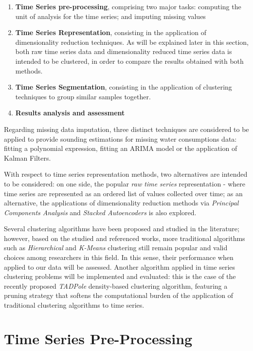 \documentclass[9pt,journal,compsoc]{IEEEtran}
\begin{document}
\begin{enumerate}
	\item \textbf{Time Series pre-processing}, comprising two major tasks: computing the unit of analysis for the time series; and imputing missing values
	
	\item \textbf{Time Series Representation}, consisting in the application of dimensionality reduction techniques. As will be explained later in this section, both raw time series data and dimensionality reduced time series data is intended to be clustered, in order to compare the results obtained with both methods.
	
	\item \textbf{Time Series Segmentation}, consisting in the application of clustering techniques to group similar samples together.
	
	\item \textbf{Results analysis and assessment}
\end{enumerate}
 
Regarding missing data imputation, three distinct techniques are considered to be applied to provide sounding estimations for missing water consumptions data: fitting a polynomial expression, fitting an ARIMA model or the application of Kalman Filters.

With respect to time series representation methods, two alternatives are intended to be considered: on one side, the popular \emph{raw time series} representation - where time series are represented as an ordered list of values collected over time; as an alternative, the applications of dimensionality reduction methods via \emph{Principal Components Analysis} and \emph{Stacked Autoencoders} is also explored.
	
Several clustering algorithms have been proposed and studied in the literature; however, based on the studied and referenced works, more traditional algorithms such as \emph{Hierarchical} and \emph{K-Means} clustering still remain popular and valid choices among researchers in this field. In this sense, their performance when applied to our data will be assessed. Another algorithm applied in time series clustering problems will be implemented and evaluated: this is the case of the recently proposed \emph{TADPole} density-based clustering algorithm, featuring a pruning strategy that softens the computational burden of the application of traditional clustering algorithms to time series.

\section{Time Series Pre-Processing}
\label{pre_processing}
\end{document}
